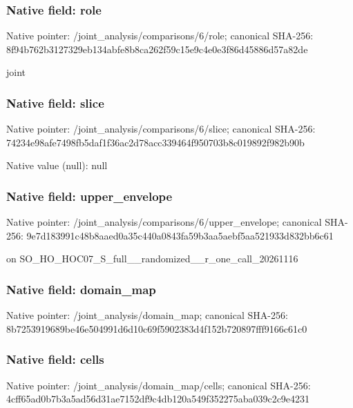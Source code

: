 \documentclass[10pt,a4paper]{article}
\begin{document}
\subsubsection{Native field: role}
Native pointer: /joint\_\allowbreak{}analysis/comparisons/6/role; canonical SHA-256: 8f94b762b3127329eb134abfe8b8ca262f59c15e9c4e0e3f86d45886d57a82de

\begingroup\raggedright\sloppy joint\par\endgroup

\subsubsection{Native field: slice}
Native pointer: /joint\_\allowbreak{}analysis/comparisons/6/slice; canonical SHA-256: 74234e98afe7498fb5daf1f36ac2d78acc339464f950703b8c019892f982b90b

Native value (null): null

\subsubsection{Native field: upper\_\allowbreak{}envelope}
Native pointer: /joint\_\allowbreak{}analysis/comparisons/6/upper\_\allowbreak{}envelope; canonical SHA-256: 9e7d183991c48b8aaed0a35c440a0843fa59b3aa5aebf5aa521933d832bb6c61

\begingroup\raggedright{} on SO\_\allowbreak{}HO\_\allowbreak{}HOC07\_\allowbreak{}S\_\allowbreak{}full\_\allowbreak{}\_\allowbreak{}randomized\_\allowbreak{}\_\allowbreak{}r\_\allowbreak{}one\_\allowbreak{}call\_\allowbreak{}20261116\par\endgroup

\subsubsection{Native field: domain\_\allowbreak{}map}
Native pointer: /joint\_\allowbreak{}analysis/domain\_\allowbreak{}map; canonical SHA-256: 8b7253919689be46e504991d6d10c69f5902383d4f152b720897fff9166c61c0

\subsubsection{Native field: cells}
Native pointer: /joint\_\allowbreak{}analysis/domain\_\allowbreak{}map/cells; canonical SHA-256: 4cff65ad0b7b3a5ad56d31ae7152df9c4db120a549f352275aba039c2c9e4231
\end{document}
